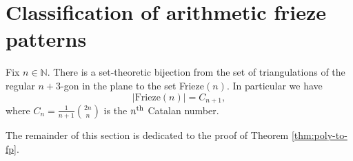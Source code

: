 \chapter{Classification of arithmetic frieze patterns}
\begin{theorem}
\label{thm:poly-to-fp}
    Fix $n \in \mathbb{N}$. There is a set-theoretic bijection from the set of triangulations of the regular $n+3$-gon in the plane
    to the set Frieze$(n)$. In particular we have
    \[
        |\text{Frieze}(n)| = C_{n+1},
    \]
    where $C_n = \frac{1}{n+1}\binom{2n}{n}$ is the $n^{\rm th}$ Catalan number.
\end{theorem}

The remainder of this section is dedicated to the proof of Theorem \ref{thm:poly-to-fp}. 

